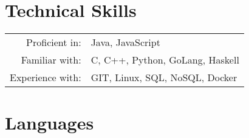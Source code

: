 \documentclass[a4paper,10pt]{article} %
\begin{document}
\vspace{5mm}







\section{Technical Skills}

\begin{tabular}{rl}
    Proficient in:   &  Java, JavaScript \\
    Familiar with:   &  C, C++, Python, GoLang, Haskell \\
    Experience with: &  GIT, Linux, SQL, NoSQL, Docker \\
\end{tabular}

\vspace{5mm}

\section{Languages}
\end{document}

